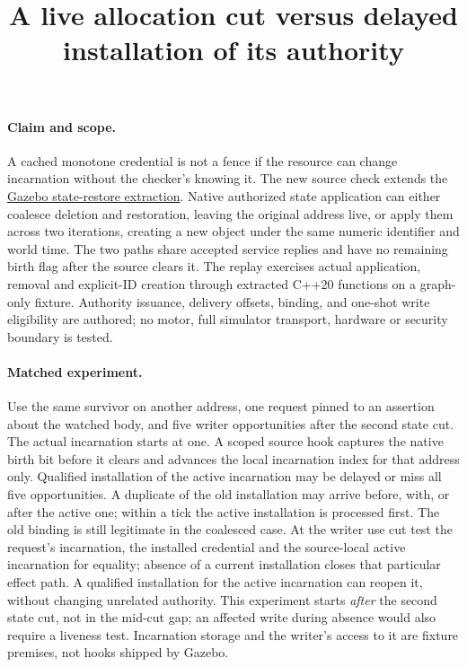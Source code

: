 \documentclass{article}
\title{A live allocation cut versus delayed installation of its authority}
\begin{document}
\maketitle

\paragraph{Claim and scope.}
A cached monotone credential is not a fence if the resource can change incarnation without the checker's knowing it. The new source check extends the \href{https://github.com/eternal-november/eos-research-programmes/pull/761}{Gazebo state-restore extraction}. Native authorized state application can either coalesce deletion and restoration, leaving the original address live, or apply them across two iterations, creating a new object under the same numeric identifier and world time. The two paths share accepted service replies and have no remaining birth flag after the source clears it. The replay exercises actual application, removal and explicit-ID creation through extracted C++20 functions on a graph-only fixture. Authority issuance, delivery offsets, binding, and one-shot write eligibility are authored; no motor, full simulator transport, hardware or security boundary is tested.

\paragraph{Matched experiment.}
Use the same survivor on another address, one request pinned to an assertion about the watched body, and five writer opportunities after the second state cut. The actual incarnation starts at one. A scoped source hook captures the native birth bit before it clears and advances the local incarnation index for that address only. Qualified installation of the active incarnation may be delayed or miss all five opportunities. A duplicate of the old installation may arrive before, with, or after the active one; within a tick the active installation is processed first. The old binding is still legitimate in the coalesced case. At the writer use cut test the request's incarnation, the installed credential and the source-local active incarnation for equality; absence of a current installation closes that particular effect path. A qualified installation for the active incarnation can reopen it, without changing unrelated authority. This experiment starts {\em after} the second state cut, not in the mid-cut gap; an affected write during absence would also require a liveness test. Incarnation storage and the writer's access to it are fixture premises, not hooks shipped by Gazebo.
\end{document}
